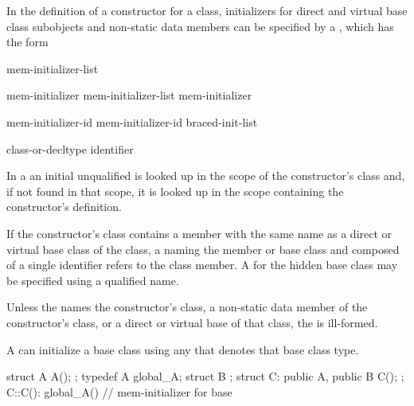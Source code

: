 \pnum
In the definition of a constructor for a class,
initializers for direct and virtual base class subobjects and
non-static data members can be specified by a
,
which has the form

\begin{bnf}
\br
    \terminal{:} mem-initializer-list
\end{bnf}

\begin{bnf}
\br
    mem-initializer \br
    mem-initializer-list \terminal{,} mem-initializer 
\end{bnf}

\begin{bnf}
\br
    mem-initializer-id \terminal{(}  \terminal{)}\br
    mem-initializer-id braced-init-list
\end{bnf}

\begin{bnf}
\br
    class-or-decltype\br
    identifier
\end{bnf}

\pnum
In a  an initial unqualified
 is looked up in the scope of the constructor's class
and, if not found in that scope, it is looked up in the scope containing the
constructor's definition.
\begin{note}
If the constructor's class contains a member with the same name as a direct
or virtual base class of the class, a
naming the member or base class and composed of a single identifier
refers to the class member.
A
for the hidden base class may be specified using a qualified name.
\end{note}
Unless the
names the constructor's class,
a non-static data member of the constructor's class, or
a direct or virtual base of that class,
the
is ill-formed.

\pnum
A
can initialize a base class using any  that denotes that base class type.
\begin{example}

\begin{codeblock}
struct A { A(); };
typedef A global_A;
struct B { };
struct C: public A, public B { C(); };
C::C(): global_A() { }          // mem-initializer for base 
\end{codeblock}
\end{example}

